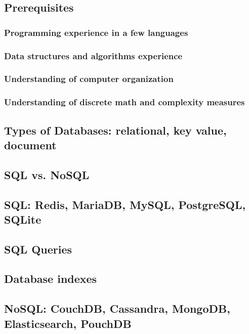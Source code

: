 %
%


\subsection{Prerequisites}

  \subsubsection{Programming experience in a few languages}
  \subsubsection{Data structures and algorithms experience}
  \subsubsection{Understanding of computer organization}
  \subsubsection{Understanding of discrete math and complexity measures}

\subsection{Types of Databases: relational, key value, document}

\subsection{SQL vs. NoSQL}

\subsection{SQL: Redis, MariaDB, MySQL, PostgreSQL, SQLite}

\subsection{SQL Queries}

\subsection{Database indexes}

\subsection{NoSQL: CouchDB, Cassandra, MongoDB, Elasticsearch, PouchDB}

